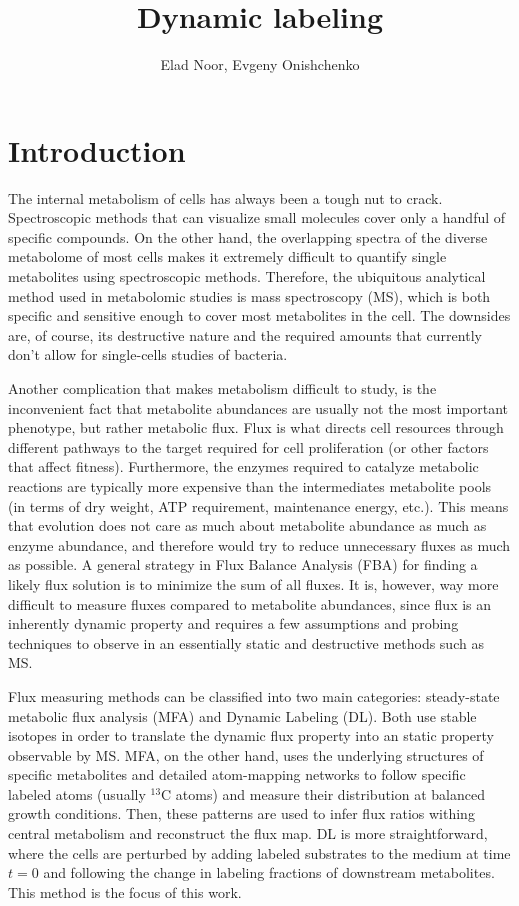 \documentclass{article}
\title{Dynamic labeling}
\author{Elad Noor, Evgeny Onishchenko}
\begin{document}
\maketitle

\section{Introduction}

The internal metabolism of cells has always been a tough nut to crack. Spectroscopic methods that can visualize small molecules cover only a handful of specific compounds. On the other hand, the overlapping spectra of the diverse metabolome of most cells makes it extremely difficult to quantify single metabolites using spectroscopic methods. Therefore, the ubiquitous analytical method used in metabolomic studies is mass spectroscopy (MS), which is both specific and sensitive enough to cover most metabolites in the cell. The downsides are, of course, its destructive nature and the required amounts that currently don't allow for single-cells studies of bacteria.

Another complication that makes metabolism difficult to study, is the inconvenient fact that metabolite abundances are usually not the most important phenotype, but rather metabolic flux. Flux is what directs cell resources through different pathways to the target required for cell proliferation (or other factors that affect fitness). Furthermore, the enzymes required to catalyze metabolic reactions are typically more expensive than the intermediates metabolite pools (in terms of dry weight, ATP requirement, maintenance energy, etc.). This means that evolution does not care as much about metabolite abundance as much as enzyme abundance, and therefore would try to reduce unnecessary fluxes as much as possible. A general strategy in Flux Balance Analysis (FBA) for finding a likely flux solution is to minimize the sum of all fluxes. It is, however, way more difficult to measure fluxes compared to metabolite abundances, since flux is an inherently dynamic property and requires a few assumptions and probing techniques to observe in an essentially static and destructive methods such as MS.

Flux measuring methods can be classified into two main categories: steady-state metabolic flux analysis (MFA) and Dynamic Labeling (DL). Both use stable isotopes in order to translate the dynamic flux property into an static property observable by MS. MFA, on the other hand, uses the underlying structures of specific metabolites and detailed atom-mapping networks to follow specific labeled atoms (usually $^{13}$C atoms) and measure their distribution at balanced growth conditions. Then, these patterns are used to infer flux ratios withing central metabolism and reconstruct the flux map. DL is more straightforward, where the cells are perturbed by adding labeled substrates to the medium at time $t = 0$ and following the change in labeling fractions of downstream metabolites. This method is the focus of this work.
\end{document}

